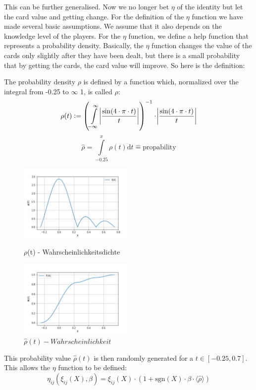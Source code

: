 This can be further generalised. Now we no longer bet $\eta$ of the identity but let the card value and getting change. For the definition of the $\eta$ function we have made several basic assumptions. We assume that it also depends on the knowledge level of the players. For the $\eta$ function, we define a help function that represents a probability density. Basically, the $\eta$ function changes the value of the cards only slightly after they have been dealt, but there is a small probability that by getting the cards, the card value will improve. So here is the definition:
\begin{definition}
The probability density $\rho$ is defined by a function which, normalized over the integral from -0.25 to $\infty$ 1, is called $\hat{\rho}$:
$$
\rho (t) := \left(\int\limits_{-\infty}^{\infty}\abs{\frac{\sin(4\cdot\pi\cdot t)}{t}}\right)^{-1}\cdot\abs{\frac{\sin(4\cdot\pi\cdot t)}{t}}
$$
$$
\widehat{\rho} = \int\limits_{-0.25}^{x}\rho (t)\mathrm{d} t\widehat{=}\mathrm{propability}
$$
\end{definition}
\begin{figure}[h]
    \centering
    \includegraphics[width=0.5\textwidth]{Bilder/b1_e}
    \caption{$\rho$(t) - Wahrscheinlichkeitsdichte}
    \label{fig:8}
    \centering
    \includegraphics[width=0.5\textwidth]{Bilder/b1_f}
    \caption{$\widehat{\rho}(t) - Wahrscheinlichkeit$}
    \label{fig:9}
\end{figure}
This probability value $\hat{\rho}(t)$ is then randomly generated for a $t\in [-0.25,0.7]$. This allows the $\eta$ function to be defined:
\begin{equation*}
\eta_{ij}(\xi_{ij}(X),\beta) = \xi_{ij}(X)\cdot(1+\mathrm{sgn}(X)\cdot\beta\cdot\langle\widehat{\rho}\rangle)
\end{equation*}
